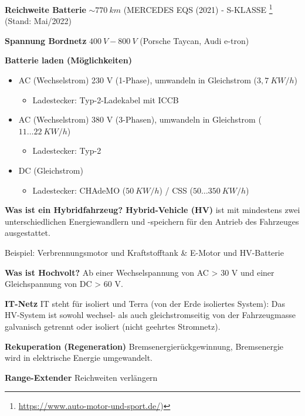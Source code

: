 \textbf{Reichweite Batterie} $\sim 770~km$ (MERCEDES EQS (2021) -
S-KLASSE \footnote{\url{https://www.auto-motor-und-sport.de/})} (Stand:
Mai/2022)

\textbf{Spannung Bordnetz} $400~V - 800~V$ (Porsche Taycan, Audi
e-tron)

\textbf{Batterie laden (Möglichkeiten)}

\begin{itemize}
\item
  AC (Wechselstrom) 230 V (1-Phase), umwandeln in Gleichstrom
  ($3,7~KW/h$)

  \begin{itemize}
  \item
    Ladestecker: Typ-2-Ladekabel mit ICCB
  \end{itemize}
\item
  AC (Wechselstrom) 380 V (3-Phasen), umwandeln in Gleichstrom
  ($11 \dots 22~KW/h$)

  \begin{itemize}
  \item
    Ladestecker: Typ-2
  \end{itemize}
\item
  DC (Gleichstrom)

  \begin{itemize}
  \item
    Ladestecker: CHAdeMO ($50~KW/h$) / CSS ($50 \dots 350~KW/h$)
  \end{itemize}
\end{itemize}

\textbf{Was ist ein Hybridfahrzeug? Hybrid-Vehicle (HV)} ist mit
mindestens zwei unterschiedlichen Energiewandlern und -speichern für den
Antrieb des Fahrzeuges ausgestattet.

Beispiel: Verbrennungsmotor und Kraftstofftank \& E-Motor und
HV-Batterie

\textbf{Was ist Hochvolt?} Ab einer Wechselspannung von AC
> 30 V und einer Gleichspannung von DC > 60 V.

\textbf{IT-Netz} IT steht für isoliert und Terra (von der Erde
isoliertes System): Das HV-System ist sowohl wechsel- als auch
gleichstromseitig von der Fahrzeugmasse galvanisch getrennt oder
isoliert (nicht geehrtes Stromnetz).

\textbf{Rekuperation (Regeneration)} Bremsenergierückgewinnung,
Bremsenergie wird in elektrische Energie umgewandelt.

\textbf{Range-Extender} Reichweiten verlängern

